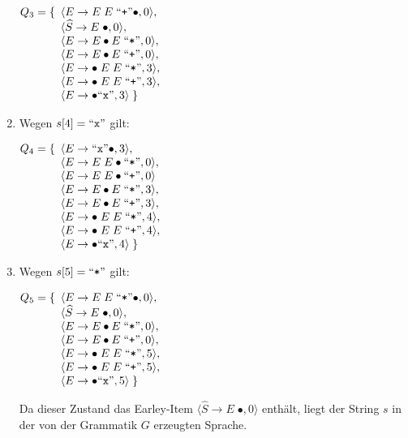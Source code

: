 \documentclass{article}
\def\pair(#1,#2){\langle #1, #2 \rangle}
\newcommand{\quoted}[1]{\mbox{``\texttt{#1}''}}
\def\pair(#1,#2){\langle #1, #2 \rangle}
\begin{document}
\begin{enumerate}
      $Q_3 = \{
       \begin{array}[t]{l} 
         \pair(E \rightarrow  E\; E\; \quoted{+}\bullet, 0), \\
         \pair(\widehat{S} \rightarrow  E\;\bullet, 0), \\
         \pair(E \rightarrow  E\bullet E\; \quoted{*}, 0), \\
         \pair(E \rightarrow  E\bullet E\; \quoted{+}, 0), \\
         \pair(E \rightarrow \bullet\; E\; E\; \quoted{*}, 3), \\
         \pair(E \rightarrow \bullet\; E\; E\; \quoted{+}, 3), \\
         \pair(E \rightarrow \bullet \quoted{x}, 3)\; \}
       \end{array}
      $
\item Wegen $s[4] = \quoted{x}$ gilt:

      $Q_4 = \{
       \begin{array}[t]{l}
         \pair(E \rightarrow  \quoted{x}\bullet, 3), \\
         \pair(E \rightarrow  E\; E\bullet \quoted{*}, 0), \\
         \pair(E \rightarrow  E\; E\bullet \quoted{+}, 0)\, \\
         \pair(E \rightarrow  E\bullet E\; \quoted{*}, 3), \\
         \pair(E \rightarrow  E\bullet E\; \quoted{+}, 3), \\
         \pair(E \rightarrow \bullet\; E\; E\; \quoted{*}, 4), \\
         \pair(E \rightarrow \bullet\; E\; E\; \quoted{+}, 4), \\
         \pair(E \rightarrow \bullet \quoted{x}, 4)\; \}
       \end{array}
      $

\item Wegen $s[5] = \quoted{*}$ gilt:

      $Q_5 = \{
       \begin{array}[t]{l}    
         \pair(E \rightarrow  E\; E\; \quoted{*}\bullet, 0), \\
         \pair(\widehat{S} \rightarrow  E\;\bullet, 0), \\
         \pair(E \rightarrow  E\bullet E\; \quoted{*}, 0), \\
         \pair(E \rightarrow  E\bullet E\; \quoted{+}, 0), \\
         \pair(E \rightarrow \bullet\; E\; E\; \quoted{*}, 5), \\
         \pair(E \rightarrow \bullet\; E\; E\; \quoted{+}, 5), \\
         \pair(E \rightarrow \bullet \quoted{x}, 5)\; \}
       \end{array}
      $

      Da dieser Zustand das Earley-Item $\pair(\widehat{S} \rightarrow  E\;\bullet, 0)$
      enth\"alt, liegt der String $s$ in der von der Grammatik $G$ erzeugten Sprache.
      
\end{enumerate}
\end{document}
